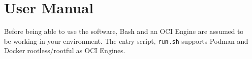 \chapter{User Manual\label{chap:user_man}}

Before being able to use the software, Bash and an OCI Engine are assumed to be working in your environment. The entry script, \texttt{run.sh} supports Podman and Docker rootless/rootful as OCI Engines. 